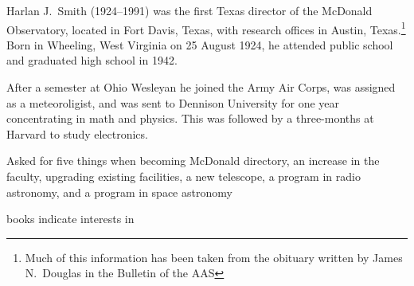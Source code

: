 

Harlan J.~Smith (1924--1991) was the first Texas director of the
McDonald Observatory, located in Fort Davis, Texas, with research
offices in Austin, Texas.\footnote{Much of this information has been
taken from the obituary written by James N.~Douglas in the Bulletin of
the AAS\cite{Douglas1992Harlan}} Born in Wheeling, West Virginia on 25 August
1924, he attended public school and graduated high school in 1942.

After a semester at Ohio Wesleyan he joined the Army Air Corps, was
assigned as a meteoroligist, and was sent to Dennison University for
one year concentrating in math and physics. This was followed by a
three-months at Harvard to study electronics.

Asked for five things when becoming McDonald directory, an increase in
the faculty, upgrading existing facilities, a new telescope, a program
in radio astronomy, and a program in space astronomy

books indicate interests in

